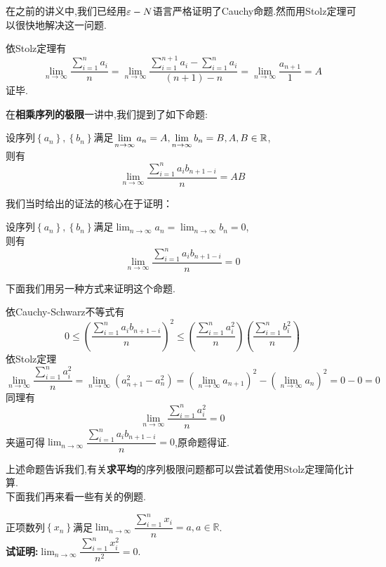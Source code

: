\documentclass[a4paper]{ctexart}
\begin{document}
在之前的讲义中,我们已经用$\varepsilon-N$语言严格证明了Cauchy命题.然而用Stolz定理可以很快地解决这一问题.
\begin{solution}
    依Stolz定理有$$\lim_{n\to\infty}{\dfrac{\sum_{i=1}^{n}{a_i}}{n}}=\lim_{n\to\infty}{\dfrac{\sum_{i=1}^{n+1}{a_i}-\sum_{i=1}^{n}{a_i}}{(n+1)-n}}=\lim_{n\to\infty}{\dfrac{a_{n+1}}{1}}=A$$
    证毕.
\end{solution}\noindent
在\textbf{\songti 相乘序列的极限}一讲中,我们提到了如下命题:
\begin{formal}
    设序列$\left\{a_n\right\},\left\{b_n\right\}$满足$\displaystyle\lim_{n\to\infty}{a_n}=A,\lim_{n\to\infty}{b_n}=B,A,B\in\mathbb{R}$,\\
    则有$$\lim_{n\to\infty}{\dfrac{\sum_{i=1}^{n}{a_ib_{n+1-i}}}{n}}=AB$$
\end{formal}\noindent
我们当时给出的证法的核心在于证明：
\begin{formal}
    设序列$\left\{a_n\right\},\left\{b_n\right\}$满足$\displaystyle\lim_{n\to\infty}{a_n}=\lim_{n\to\infty}{b_n}=0$,\\
    则有$$\lim_{n\to\infty}{\dfrac{\sum_{i=1}^{n}{a_ib_{n+1-i}}}{n}}=0$$
\end{formal}\noindent
下面我们用另一种方式来证明这个命题.
\begin{solution}
    依Cauchy-Schwarz不等式有
    $$0\leqslant\left(\dfrac{\sum_{i=1}^{n}{a_ib_{n+1-i}}}{n}\right)^2\leqslant\left(\dfrac{\sum_{i=1}^n{a_i^2}}{n}\right)\left(\dfrac{\sum_{i=1}^n{b_i^2}}{n}\right)$$
    依Stolz定理$$\lim_{n\to\infty}\dfrac{\sum_{i=1}^n{a_i^2}}{n}=\lim_{n\to\infty}{\left(a_{n+1}^2-a_n^2\right)}=\left(\lim_{n\to\infty}{a_{n+1}}\right)^2-\left(\lim_{n\to\infty}{a_n}\right)^2=0-0=0$$
    同理有$$\lim_{n\to\infty}\dfrac{\sum_{i=1}^n{a_i^2}}{n}=0$$
    夹逼可得$\lim_{n\to\infty}{\dfrac{\sum_{i=1}^{n}{a_ib_{n+1-i}}}{n}}=0$,原命题得证.
\end{solution}\noindent
上述命题告诉我们,有关\textbf{\songti 求平均}的序列极限问题都可以尝试着使用Stolz定理简化计算.\\
下面我们再来看一些有关的例题.
\begin{problem}[例1(24.10.09 SJTU数分小测).]
    正项数列$\left\{ x_n\right\}$满足$\displaystyle\lim_{n\to\infty}{\dfrac{\sum_{i=1}^{n}{x_i}}{n}}=a,a\in\mathbb{R}$.\\
    \textbf{试证明:}$\displaystyle\lim_{n\to\infty}{\dfrac{\sum_{i=1}^{n}{x_i^2}}{n^2}}=0$.
\end{problem}
\end{document}
